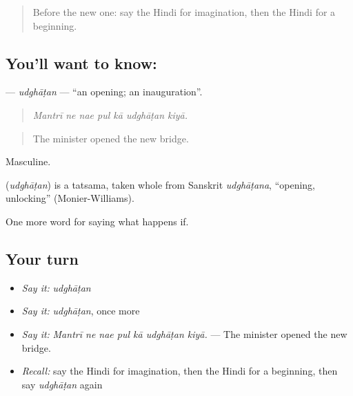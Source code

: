 \label{lesson:HI-C559-udghatan}



\begin{quote}
Before the new one: say the Hindi for imagination, then the Hindi for a beginning.
\end{quote}

\subsection*{You'll want to know: }
\textbf{} — \emph{udghāṭan} — \textquotedblleft{}an opening; an inauguration\textquotedblright{}.

\begin{quote}
      
\end{quote}

\begin{quote}
\emph{Mantrī ne nae pul kā udghāṭan kiyā.}
\end{quote}

\begin{quote}
The minister opened the new bridge.
\end{quote}

Masculine.

\begin{cousinweb}
\textbf{} (\emph{udghāṭan}) is a tatsama, taken whole from Sanskrit \emph{udghāṭana}, \textquotedblleft{}opening, unlocking\textquotedblright{} (Monier-Williams).
\end{cousinweb}

\begin{grammarlens}[title={What you've built}]
One more word for saying what happens if.
\end{grammarlens}

\subsection*{Your turn}
\begin{itemize}
\raggedright
  \item \emph{Say it:} \emph{udghāṭan}
  \item \emph{Say it:} \emph{udghāṭan}, once more
  \item \emph{Say it:} \emph{Mantrī ne nae pul kā udghāṭan kiyā.} — The minister opened the new bridge.
  \item \emph{Recall:} say the Hindi for imagination, then the Hindi for a beginning, then say \emph{udghāṭan} again
\end{itemize}

